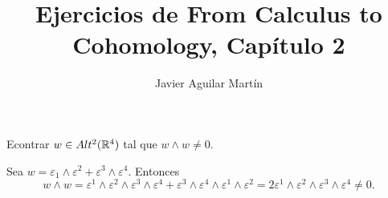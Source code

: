 \documentclass[twoside]{article}
\begin{document}
\title{Ejercicios de From Calculus to Cohomology, Capítulo 2}
\author{Javier Aguilar Martín}
\maketitle


\begin{ejercicio}{2.2}
Econtrar $w\in Alt^2(\mathbb{R}^4)$ tal que $w\land w\neq 0$.
\end{ejercicio}
\begin{solucion}
Sea $w=\varepsilon_1\land \varepsilon^2 +\varepsilon^3\land \varepsilon^4$. Entonces
$$w\land w= \varepsilon^1\land \varepsilon^2\land \varepsilon^3\land \varepsilon^4 +\varepsilon^3\land \varepsilon^4\land \varepsilon^1\land \varepsilon^2=2\varepsilon^1\land \varepsilon^2\land \varepsilon^3\land \varepsilon^4 \neq 0.$$
\end{solucion}

\newpage
\end{document}
